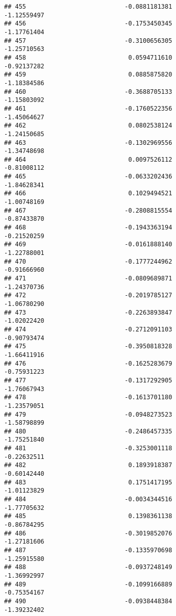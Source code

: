 \documentclass[
]{article}
\begin{document}
\begin{verbatim}
## 455                           -0.0881181381                -1.12559497
## 456                           -0.1753450345                -1.17761404
## 457                           -0.3100656305                -1.25710563
## 458                            0.0594711610                -0.92137282
## 459                            0.0885875820                -1.18384586
## 460                           -0.3688705133                -1.15803092
## 461                           -0.1760522356                -1.45064627
## 462                            0.0802538124                -1.24150685
## 463                           -0.1302969556                -1.34748698
## 464                            0.0097526112                -0.81008112
## 465                           -0.0633202436                -1.84628341
## 466                            0.1029494521                -1.00748169
## 467                           -0.2808815554                -0.87433870
## 468                           -0.1943363194                -0.21520259
## 469                           -0.0161888140                -1.22788001
## 470                           -0.1777244962                -0.91666960
## 471                           -0.0809689871                -1.24370736
## 472                           -0.2019785127                -1.06780290
## 473                           -0.2263893847                -1.02022420
## 474                           -0.2712091103                -0.90793474
## 475                           -0.3950818328                -1.66411916
## 476                           -0.1625283679                -0.75931223
## 477                           -0.1317292905                -1.76067943
## 478                           -0.1613701180                -1.23579051
## 479                           -0.0948273523                -1.58798899
## 480                           -0.2486457335                -1.75251840
## 481                           -0.3253001118                -0.22632511
## 482                            0.1893918387                -0.60142440
## 483                            0.1751417195                -1.01123829
## 484                           -0.0034344516                -1.77705632
## 485                            0.1398361138                -0.86784295
## 486                           -0.3019852076                -1.27181606
## 487                           -0.1335970698                -1.25915580
## 488                           -0.0937248149                -1.36992997
## 489                           -0.1099166889                -0.75354167
## 490                           -0.0938448384                -1.39232402

\end{verbatim}
\end{document}
